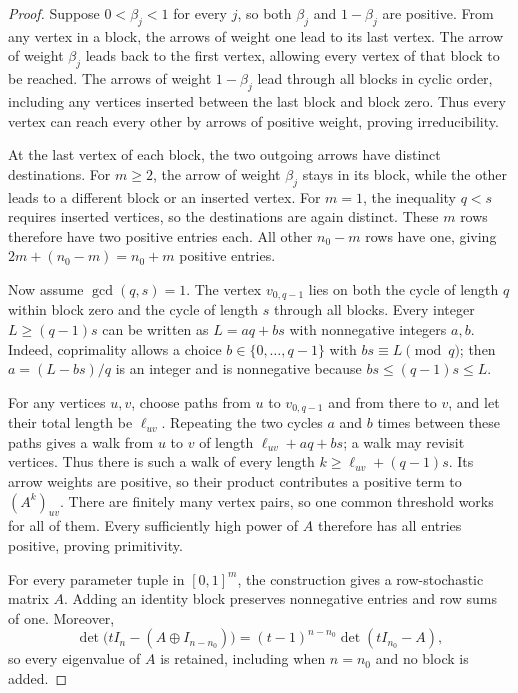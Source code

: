 \documentclass[11pt,a4paper]{article}
\theoremstyle{definition}
\theoremstyle{remark}
\numberwithin{equation}{section}
\begin{document}
\begin{proof}
Suppose $0<\beta_j<1$ for every $j$, so both $\beta_j$ and $1-\beta_j$ are positive. From any vertex in a block, the arrows of weight one lead to its last vertex. The arrow of weight $\beta_j$ leads back to the first vertex, allowing every vertex of that block to be reached. The arrows of weight $1-\beta_j$ lead through all blocks in cyclic order, including any vertices inserted between the last block and block zero. Thus every vertex can reach every other by arrows of positive weight, proving irreducibility.

At the last vertex of each block, the two outgoing arrows have distinct destinations. For $m\ge2$, the arrow of weight $\beta_j$ stays in its block, while the other leads to a different block or an inserted vertex. For $m=1$, the inequality $q<s$ requires inserted vertices, so the destinations are again distinct. These $m$ rows therefore have two positive entries each. All other $n_0-m$ rows have one, giving $2m+(n_0-m)=n_0+m$ positive entries.

Now assume $\gcd(q,s)=1$. The vertex $v_{0,q-1}$ lies on both the cycle of length $q$ within block zero and the cycle of length $s$ through all blocks. Every integer $L\ge(q-1)s$ can be written as $L=aq+bs$ with nonnegative integers $a,b$. Indeed, coprimality allows a choice $b\in\{0,\ldots,q-1\}$ with $bs\equiv L\pmod q$; then $a=(L-bs)/q$ is an integer and is nonnegative because $bs\le(q-1)s\le L$.

For any vertices $u,v$, choose paths from $u$ to $v_{0,q-1}$ and from there to $v$, and let their total length be $\ell_{uv}$. Repeating the two cycles $a$ and $b$ times between these paths gives a walk from $u$ to $v$ of length $\ell_{uv}+aq+bs$; a walk may revisit vertices. Thus there is such a walk of every length $k\ge\ell_{uv}+(q-1)s$. Its arrow weights are positive, so their product contributes a positive term to $(A^k)_{uv}$. There are finitely many vertex pairs, so one common threshold works for all of them. Every sufficiently high power of $A$ therefore has all entries positive, proving primitivity.

For every parameter tuple in $[0,1]^m$, the construction gives a row-stochastic matrix $A$. Adding an identity block preserves nonnegative entries and row sums of one. Moreover,
\[
 \det\bigl(tI_n-(A\oplus I_{n-n_0})\bigr)
 =(t-1)^{n-n_0}\det(tI_{n_0}-A),
\]
so every eigenvalue of $A$ is retained, including when $n=n_0$ and no block is added.
\end{proof}
\end{document}
